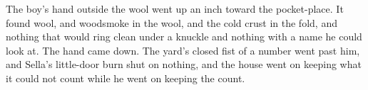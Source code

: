 The boy's hand outside the wool went up an inch toward the pocket-place. It found wool, and woodsmoke in the wool, and the cold crust in the fold, and nothing that would ring clean under a knuckle and nothing with a name he could look at. The hand came down. The yard's closed fist of a number went past him, and Sella's little-door burn shut on nothing, and the house went on keeping what it could not count while he went on keeping the count.
